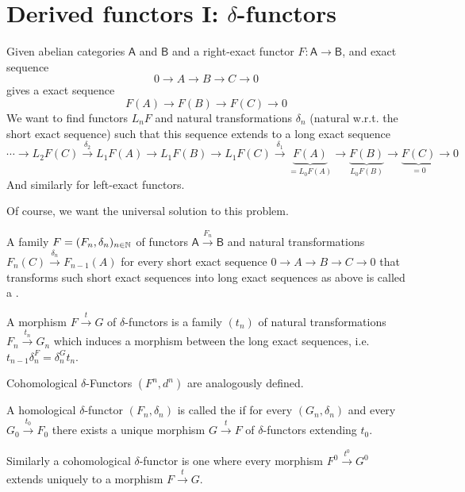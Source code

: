 \documentclass[fontsize=11pt,fleqn,a4paper]{scrartcl}
\begin{document}
\section{Derived functors I: \texorpdfstring{$\delta$}{δ}-functors}

\begin{remark}
Given abelian categories $\mathsf{A}$ and $\mathsf{B}$ and a right-exact functor $F: \mathsf{A} \to \mathsf{B}$, and exact sequence
\[0\to A \to B \to C \to 0\]
gives a exact sequence
\[F(A) \to F(B) \to F(C) \to 0\]
We want to find functors $L_nF$ and natural transformations $\delta_n$ (natural w.r.t. the short exact sequence) such that this sequence extends to a long exact sequence
\[\cdots \to L_2F(C) \xrightarrow{\delta_2} L_1F(A) \to L_1F(B) \to L_1F(C) \xrightarrow{\delta_1} \underbrace{F(A)}_{=L_0F(A)} \to \underbrace{F(B)}_{L_0F(B)} \to \underbrace{F(C)}_{=0} \to 0\]
And similarly for left-exact functors.

Of course, we want the universal solution to this problem.
\end{remark}

\begin{definition}
A family $F=(F_n,\delta_n)_{n\in\mathbb{N}}$ of functors $\mathsf{A} \xrightarrow{F_n} \mathsf{B}$ and natural transformations $F_n(C) \xrightarrow{\delta_n} F_{n-1}(A)$ for every short exact sequence $0\to A\to B\to C\to 0$ that transforms such short exact sequences into long exact sequences as above is called a .

A morphism $F\xrightarrow{t}G$ of $\delta$-functors is a family $(t_n)$ of natural transformations $F_n \xrightarrow{t_n} G_n$ which induces a morphism between the long exact sequences, i.e. $t_{n-1}\delta_n^F = \delta_n^G t_n$.

\medbreak
Cohomological $\delta$-Functors $(F^n,d^n)$ are analogously defined.
\end{definition}

\begin{definition}
A homological $\delta$-functor $(F_n,\delta_n)$ is called the  if for every $(G_n,\delta_n)$ and every $G_0 \xrightarrow{t_0} F_0$ there exists a unique morphism $G \xrightarrow{t} F$ of $\delta$-functors extending $t_0$.

Similarly a cohomological $\delta$-functor is one where every morphism $F^0 \xrightarrow{t^0} G^0$ extends uniquely to a morphism $F \xrightarrow{t} G$.
\end{definition}
\end{document}
